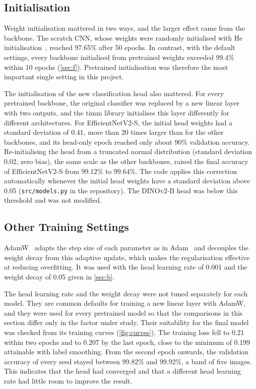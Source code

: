 \documentclass[11pt,a4paper]{article}
\newcommand{\pct}[1]{#1\%}
\begin{document}
\subsection*{Initialisation}

Weight initialisation mattered in two ways, and the larger effect came from the backbone. The scratch CNN, whose weights were randomly initialised with He initialisation~\cite{he2015init}, reached \pct{97.65} after 50 epochs. In contrast, with the default settings, every backbone initialised from pretrained weights exceeded \pct{99.4} within 10 epochs (\cref{sec:f}). Pretrained initialisation was therefore the most important single setting in this project.

The initialisation of the new classification head also mattered. For every pretrained backbone, the original classifier was replaced by a new linear layer with two outputs, and the timm library initialises this layer differently for different architectures. For EfficientNetV2-S, the initial head weights had a standard deviation of 0.41, more than 20 times larger than for the other backbones, and its head-only epoch reached only about \pct{90} validation accuracy. Re-initialising the head from a truncated normal distribution (standard deviation 0.02, zero bias), the same scale as the other backbones, raised the final accuracy of EfficientNetV2-S from \pct{99.12} to \pct{99.64}. The code applies this correction automatically whenever the initial head weights have a standard deviation above 0.05 (\texttt{src/models.py} in the repository). The DINOv2-B head was below this threshold and was not modified.

\subsection*{Other Training Settings}

AdamW~\cite{loshchilov2019adamw} adapts the step size of each parameter as in Adam~\cite{kingma2015adam} and decouples the weight decay from this adaptive update, which makes the regularisation effective at reducing overfitting. It was used with the head learning rate of 0.001 and the weight decay of 0.05 given in \cref{sec:b}.

The head learning rate and the weight decay were not tuned separately for each model. They are common defaults for training a new linear layer with AdamW, and they were used for every pretrained model so that the comparisons in this section differ only in the factor under study. Their suitability for the final model was checked from its training curves (\cref{fig:curves}). The training loss fell to 0.21 within two epochs and to 0.207 by the last epoch, close to the minimum of 0.199 attainable with label smoothing. From the second epoch onwards, the validation accuracy of every seed stayed between \pct{99.82} and \pct{99.92}, a band of five images. This indicates that the head had converged and that a different head learning rate had little room to improve the result.
\end{document}
